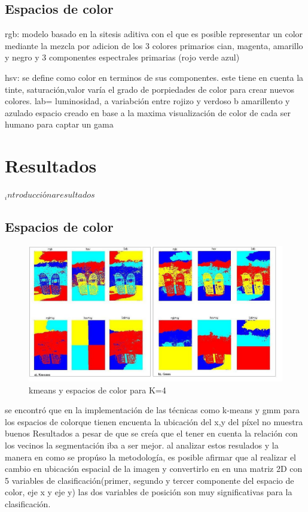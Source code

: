 \documentclass[10pt,twocolumn,letterpaper]{article}
\begin{document}
\subsection{Espacios de color}

rgb: modelo basado en la sitesis aditiva con el que es posible representar 
un color mediante la mezcla por adicion de los 3 colores primarios cian, magenta, amarillo 
y negro y 3 componentes espectrales primarias (rojo verde azul)

hsv: se define como color en terminos de sus componentes. 
este tiene en cuenta la tinte, saturación,valor
varía el grado de porpiedades de color para crear nuevos colores.
lab= luminosidad, a variabción entre rojizo y verdoso b amarillento y azulado
espacio creado en base a la maxima visualización de color de cada ser humano para captar un gama 

\section{Resultados}

$_ introducción a resultados $

\subsection{Espacios de color}

\begin{figure}[t]
\begin{center}
   \includegraphics[scale=0.3]{pru.JPG}
\end{center}
   \caption{kmeans y espacios de color para K=4 }
\label{fig:long}
\label{fig:onecol}
\end{figure}

se encontró que en la implementación de las técnicas como k-means y gmm para los espacios de colorque tienen encuenta la ubicación del x,y del píxel no muestra buenos Resultados 
a pesar de que se creía que el tener en cuenta la relación con los vecinos la segmentación iba a ser mejor. al analizar estos resulados y la manera en como se propúso la metodología,
es posible afirmar que al realizar el cambio en ubicación espacial de la imagen y convertirlo en en una matriz 2D con 5 variables de clasificación(primer, segundo y tercer componente del espacio de color, eje x y eje y)
las dos variables de posición son muy significativas para la clasificación. 
\end{document}
